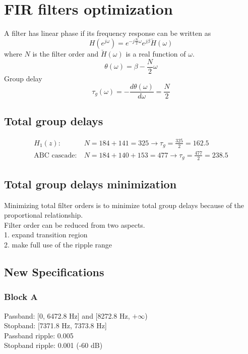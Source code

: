 \documentclass{article}
\newenvironment{homeworkProblem}[1]{
	\section{#1}
	}{
}
\newenvironment{homeworkSection}[1]{
	\subsection{#1}
	}{
}
\begin{document}
\begin{homeworkProblem}{FIR filters optimization}

A filter has linear phase if its frequency response can be written as
\begin{equation}
H(e^{j \omega}) = e^{-j\frac{N}{2}\omega} e^{j\beta} \breve{H}(\omega)
\end{equation}
where $N$ is the filter order and $\breve{H}(\omega)$ is a real function of $\omega$.
\begin{equation}
\theta(\omega) = \beta - \frac{N}{2}\omega
\end{equation}
Group delay
\begin{equation}
\tau_g(\omega) = - \frac{d\theta(\omega)}{d\omega} = \frac{N}{2}
\end{equation}

\begin{homeworkSection}{Total group delays}
\begin{align*}
H_1(z):\ &N = 184 + 141 = 325 \longrightarrow \tau_g = \frac{325}{2} = 162.5\\
\text{ABC cascade}:\ &N = 184 + 140 + 153 = 477 \longrightarrow \tau_g = \frac{477}{2} = 238.5
\end{align*}
\end{homeworkSection}


\begin{homeworkSection}{Total group delays minimization}
Minimizing total filter orders is to minimize total group delays because of the proportional relationship.\\

Filter order can be reduced from two aspects.\\
1. expand transition region\\
2. make full use of the ripple range
\end{homeworkSection}


\begin{homeworkSection}{New Specifications}
\subsubsection{Block A}
Passband: [0, 6472.8 Hz] and [8272.8 Hz, $+\infty$)\\
Stopband: [7371.8 Hz, 7373.8 Hz]\\
Passband ripple: 0.005\\
Stopband ripple: 0.001 (-60 dB)


\end{homeworkSection}
\end{homeworkProblem}
\end{document}
